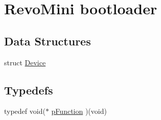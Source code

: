\hypertarget{group___revo_mini_b_l}{\section{\-Revo\-Mini bootloader}
\label{group___revo_mini_b_l}
}
\subsection*{\-Data \-Structures}
\begin{DoxyCompactItemize}
\item 
struct \hyperlink{struct_device}{\-Device}
\end{DoxyCompactItemize}
\subsection*{\-Typedefs}
\begin{DoxyCompactItemize}
\item 
typedef void($\ast$ \hyperlink{group___revo_mini_b_l_ga9227bf1f1a9c633a0cc9ca50cc761c1a}{p\-Function} )(void)
\end{DoxyCompactItemize}
